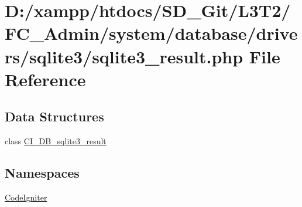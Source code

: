 \hypertarget{sqlite3__result_8php}{}\section{D\+:/xampp/htdocs/\+S\+D\+\_\+\+Git/\+L3\+T2/\+F\+C\+\_\+\+Admin/system/database/drivers/sqlite3/sqlite3\+\_\+result.php File Reference}
\label{sqlite3__result_8php}
\subsection*{Data Structures}
\begin{DoxyCompactItemize}
\item 
class \hyperlink{class_c_i___d_b__sqlite3__result}{C\+I\+\_\+\+D\+B\+\_\+sqlite3\+\_\+result}
\end{DoxyCompactItemize}
\subsection*{Namespaces}
\begin{DoxyCompactItemize}
\item 
 \hyperlink{namespace_code_igniter}{Code\+Igniter}
\end{DoxyCompactItemize}
